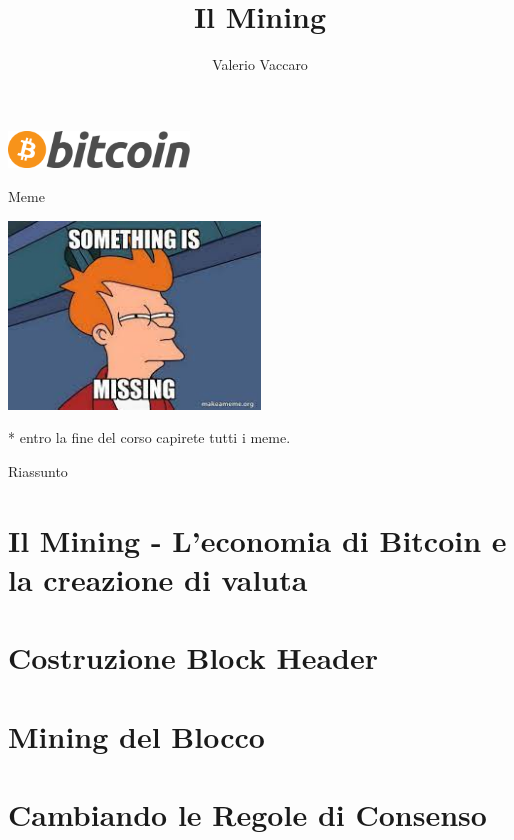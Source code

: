 \documentclass[aspectratio=169]{beamer}
\title{Il Mining}
\author{Valerio Vaccaro}
\date{\displaydate{date}}
\begin{document}
\begin{frame}
    \titlepage
    \begin{center}
        \includegraphics[height=1cm]{logo.png}
    \end{center}
\end{frame}

\begin{frame}[noframenumbering]
    \tableofcontents
\end{frame}

\begin{frame}{Meme}
    \begin{center}
        \includegraphics[height=5cm]{missing.jpg}
    \end{center}
    * entro la fine del corso capirete tutti i meme.
\end{frame}

\begin{frame}{Riassunto}
    
\end{frame}

\section{Il Mining - L’economia di Bitcoin e la creazione di valuta}

\section{Costruzione Block Header}

\section{Mining del Blocco}

\section{Cambiando le Regole di Consenso}
\end{document}
